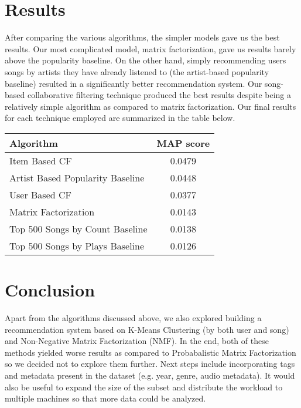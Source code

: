 \documentclass[12pt,preprint]{aastex}
\begin{document}



\section{Results}
After comparing the various algorithms, the simpler models gave us the best results. Our most complicated model, matrix factorization, gave us results barely above the popularity baseline. On the other hand, simply recommending users songs by artists they have already listened to (the artist-based popularity baseline) resulted in a significantly better recommendation system. Our song-based collaborative filtering technique produced the best results despite being a relatively simple algorithm as compared to matrix factorization. Our final results for each technique employed are summarized in the table below. 

\begin{table}[h]
\begin{center}
\begin{tabular}{lc}

\hline
\bf{Algorithm} &  \bf{MAP score}\\ \hline
Item Based  CF  &  0.0479 \\ 
Artist Based Popularity Baseline  & 0.0448    \\ 
User Based  CF  &  0.0377 \\ 
Matrix Factorization  &   0.0143  \\ 
Top 500 Songs by Count  Baseline &  0.0138  \\ 
Top 500 Songs by Plays  Baseline &  0.0126  \\ 
\end{tabular}
\end{center}
\end{table}

\section{Conclusion}
Apart from the algorithms discussed above, we also explored building a recommendation system based on K-Means Clustering (by both user and song) and Non-Negative Matrix Factorization (NMF). In the end, both of these methods yielded worse results as compared to Probabalistic Matrix Factorization so we decided not to explore them further. Next steps include incorporating tags and metadata present in the dataset (e.g. year, genre, audio metadata). It would also be useful to expand the size of the subset and distribute the workload to multiple machines so that more data could be analyzed.
\end{document}
